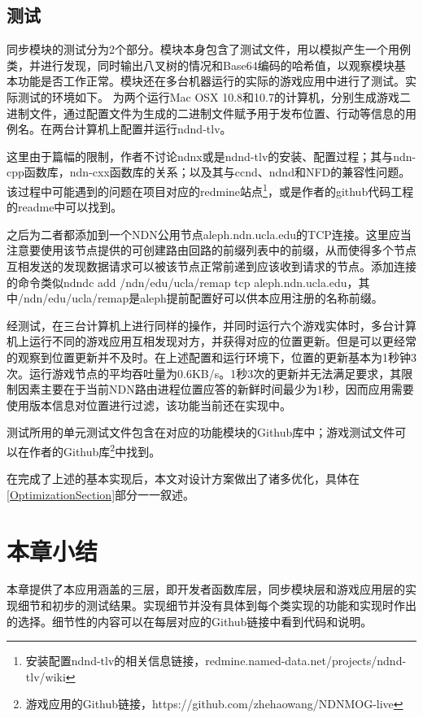 \subsection{测试}
\par
同步模块的测试分为2个部分。模块本身包含了测试文件，用以模拟产生一个用例类，并进行发现，同时输出八叉树的情况和Base64编码的哈希值，以观察模块基本功能是否工作正常。模块还在多台机器运行的实际的游戏应用中进行了测试。实际测试的环境如下。
为两个运行Mac OSX 10.8和10.7的计算机，分别生成游戏二进制文件，通过配置文件为生成的二进制文件赋予用于发布位置、行动等信息的用例名。在两台计算机上配置并运行ndnd-tlv。
\par
这里由于篇幅的限制，作者不讨论ndnx或是ndnd-tlv的安装、配置过程；其与ndn-cpp函数库，ndn-cxx函数库的关系；以及其与ccnd、ndnd和NFD的兼容性问题。该过程中可能遇到的问题在项目对应的redmine站点\footnote{安装配置ndnd-tlv的相关信息链接，redmine.named-data.net/projects/ndnd-tlv/wiki}，或是作者的github代码工程的readme中可以找到。
\par
之后为二者都添加到一个NDN公用节点aleph.ndn.ucla.edu的TCP连接。这里应当注意要使用该节点提供的可创建路由回路的前缀列表中的前缀，从而使得多个节点互相发送的发现数据请求可以被该节点正常前递到应该收到请求的节点。添加连接的命令类似ndndc add /ndn/edu/ucla/remap tcp aleph.ndn.ucla.edu，其中/ndn/edu/ucla/remap是aleph提前配置好可以供本应用注册的名称前缀。
\par
经测试，在三台计算机上进行同样的操作，并同时运行六个游戏实体时，多台计算机上运行不同的游戏应用互相发现对方，并获得对应的位置更新。但是可以更经常的观察到位置更新并不及时。在上述配置和运行环境下，位置的更新基本为1秒钟3次。运行游戏节点的平均吞吐量为0.6KB/s。1秒3次的更新并无法满足要求，其限制因素主要在于当前NDN路由进程位置应答的新鲜时间最少为1秒，因而应用需要使用版本信息对位置进行过滤，该功能当前还在实现中。
\par
测试所用的单元测试文件包含在对应的功能模块的Github库中；游戏测试文件可以在作者的Github库\footnote{游戏应用的Github链接，https://github.com/zhehaowang/NDNMOG-live}中找到。
\par
在完成了上述的基本实现后，本文对设计方案做出了诸多优化，具体在\ref{OptimizationSection}部分一一叙述。
\section{本章小结}
本章提供了本应用涵盖的三层，即开发者函数库层，同步模块层和游戏应用层的实现细节和初步的测试结果。实现细节并没有具体到每个类实现的功能和实现时作出的选择。细节性的内容可以在每层对应的Github链接中看到代码和说明。